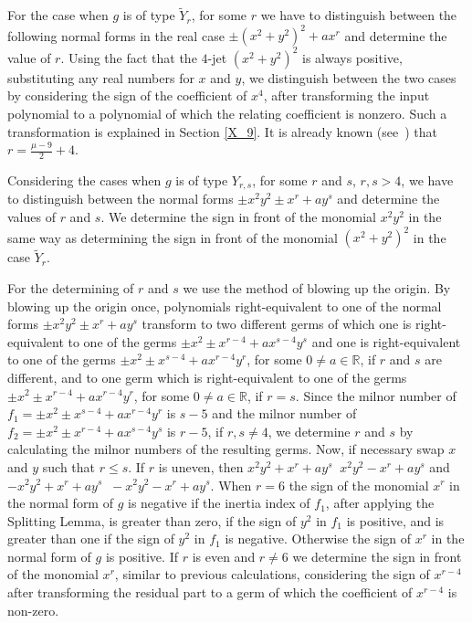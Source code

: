 \documentclass[noend]{amsproc}
\DeclareMathOperator{\requiv}{\overset{r}{\sim}}
\begin{document}
For the case when $g$ is of type $\widetilde Y_r$, for some $r$ we have to
distinguish between the following normal forms in the real case
$\pm(x^2+y^2)^2+ax^r$ and determine the value of $r$. Using the fact that the
$4$-jet $(x^2+y^2)^2$ is always positive, substituting any real numbers for $x$
and $y$,  we distinguish between the two cases by considering the sign of the coefficient of $x^4$, after transforming the input polynomial to a polynomial of which the relating coefficient is nonzero. Such a transformation is explained in Section \ref{X_9}. It is
already known (see~\cite{AVG1985}) that $r=\frac{\mu-9}{2}+4$.

Considering the cases when $g$ is of type $Y_{r,s}$, for some $r$ and $s$,
$r,s>4$, we have to distinguish between the normal forms $\pm x^2y^2\pm
x^r+ay^s$ and determine the values of $r$ and $s$.  We determine the sign in
front of the monomial $x^2y^2$ in the same way as determining the sign in front
of the monomial $(x^2+y^2)^2$ in the case $\widetilde Y_r$.

For the determining of $r$ and $s$ we use the method of blowing up the origin.
By blowing up the origin once, polynomials right-equivalent to one of the
normal forms $\pm x^2y^2\pm x^r+ay^s$ transform to two different germs of which
one is right-equivalent to one of the germs $\pm x^2\pm x^{r-4}+ax^{s-4}y^s$
and one is right-equivalent to one of the germs  $\pm x^2\pm
x^{s-4}+ax^{r-4}y^r$, for some $0\neq a\in \mathbb R$, if $r$ and $s$ are
different, and to one germ which is right-equivalent to one of the germs $\pm
x^2\pm x^{r-4}+ax^{r-4}y^r$, for some $0\neq a\in\mathbb R$, if  $r=s$. Since
the milnor number of $f_1=\pm x^2\pm x^{s-4}+ax^{r-4}y^r$ is $s-5$ and the
milnor number of $f_2=\pm x^2\pm x^{r-4}+ax^{s-4}y^s$  is $r-5$, if $r,s\neq
4$, we determine $r$ and $s$ by calculating the milnor numbers of the resulting
germs. Now, if necessary swap $x$ and $y$ such that $r\le s$. If $r$ is uneven,
then $x^2y^2+x^{r}+ay^s\requiv x^2y^2- x^{r}+ay^s$ and
$-x^2y^2+x^{r}+ay^s\requiv -x^2y^2- x^{r}+ay^s$. When $r=6$ the sign of the
monomial $x^r$ in the normal form of $g$ is negative if the inertia index of
$f_1$, after applying the Splitting Lemma, is greater than zero, if the sign of
$y^2$ in $f_1$ is positive, and is greater than one if the sign of $y^2$ in
$f_1$ is negative. Otherwise the sign of $x^r$ in the normal form of $g$ is
positive. If $r$ is even and $r\neq 6$ we determine the sign in front of the
monomial $x^r$, similar to previous calculations, considering the sign of $x^{r-4}$
after transforming the residual part to a germ of which the coefficient of $x^{r-4}$ is non-zero.
\end{document}
